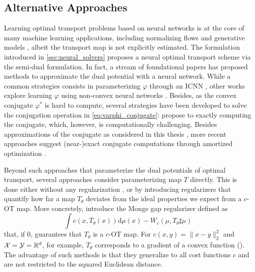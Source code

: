 \subsection{Alternative Approaches}
\label{sec:other_neural_solvers}

Learning optimal transport problems based on neural networks is at the core of many machine learning applications, including normalizing flows \citep{rezende2015variational,huang2021convex} and generative models \citep{arjovsky2017wasserstein, genevay2018learning}, albeit the transport map is not explicitly estimated.
The formulation introduced in \cref{sec:neural_solvers} proposes a neural optimal transport scheme via the semi-dual formulation. In fact, a stream of foundational papers has proposed methods to approximate the dual potential with a neural network.
While a common strategies consists in parameterizing $\varphi$ through an \acrshort{ICNN} \citep{taghvaei20192, korotin2021wasserstein, makkuva2020optimal}, other works explore learning $\varphi$ using non-convex neural networks \citep{korotin2021neural, rout2021generative, nhan2019three}.
Besides, as the convex conjugate $\varphi^*$ is hard to compute, several strategies have been developed to solve the conjugation operation in \eqref{eq:varphi_conjugate}: \citet{taghvaei20192}  propose to exactly computing the conjugate, which, however, is computationally challenging. Besides approximations of the conjugate as considered in this thesis \citep{korotin2021wasserstein, makkuva2020optimal}, more recent approaches suggest (near-)exact conjugate computations through  amortized optimization \citep{amos2023amortizing}.

Beyond such approaches that parameterize the dual potentials of optimal transport, several approaches consider parameterizing map $T$ directly. This is done either without any regularization \citep{yang2018scalable}, or by introducing regularizers that quantify how far a map $T_\theta$ deviates from the ideal properties we expect from a $c$-OT map.
More concretely, \citet{uscidda2023monge} introduce the Monge gap regularizer defined as
\begin{equation*}
	\int c(x, T_\theta(x)) \textrm{d} \mu(x) - W_c(\mu, T_\theta \sharp \mu)
\end{equation*}
that, if $0$, guarantees that $T_\theta$ is a $c$-OT map. For $c(x,y) = \|x-y\|^2_2$ and ${\mathcal{X}} = {\mathcal{Y}} = \mathbb{R}^d$, for example, $T_\theta$ corresponds to a gradient of a convex function ().
The advantage of such methods is that they generalize to all cost functions $c$ and are not restricted to the squared Euclidean distance.


